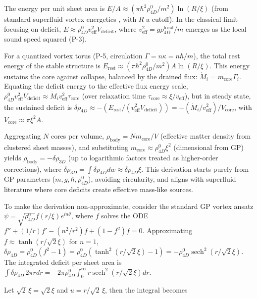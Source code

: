 \documentclass{article}
\DeclareMathOperator{\sech}{sech}
\newcommand{\scale}{\sqrt{2}\,\xi}
\begin{document}
The energy per unit sheet area is $E / A \approx (\pi \hbar^2 \rho_{4D}^0 / m^2) \ln(R / \xi)$ (from standard superfluid vortex energetics \cite{onsager1949, feynman1955}, with $R$ a cutoff). In the classical limit focusing on deficit, $E \approx \rho_{4D}^0 v_{\text{eff}}^2 V_{\text{deficit}}$, where $v_{\text{eff}}^2 = g \rho_{4D}^{\text{local}} / m$ emerges as the local sound speed squared (P-3).

For a quantized vortex torus (P-5, circulation $\Gamma = n \kappa = n \hbar / m$), the total rest energy of the stable structure is $E_{\text{rest}} \approx (\pi \hbar^2 \rho_{4D}^0 / m^2) A \ln(R / \xi)$. This energy sustains the core against collapse, balanced by the drained flux: $\dot{M}_i = m_{\text{core}} \Gamma_i$. Equating the deficit energy to the effective flux energy scale, $\rho_{4D}^0 v_{\text{eff}}^2 V_{\text{deficit}} \approx \dot{M}_i v_{\text{eff}}^2 \tau_{\text{core}}$ (over relaxation time $\tau_{\text{core}} \approx \xi / v_{\text{eff}}$), but in steady state, the sustained deficit is $\delta \rho_{4D} \approx - (E_{\text{rest}} / (v_{\text{eff}}^2 V_{\text{deficit}})) = - (\dot{M}_i / v_{\text{eff}}^2) / V_{\text{core}}$, with $V_{\text{core}} \approx \pi \xi^2 A$.

Aggregating $N$ cores per volume, $\rho_{\text{body}} = N m_{\text{core}} / V$ (effective matter density from clustered sheet masses), and substituting $m_{\text{core}} \approx \rho_{4D}^0 \xi^2$ (dimensional from GP) yields $\rho_{\text{body}} = - \delta \rho_{3D}$ (up to logarithmic factors treated as higher-order corrections), where $\delta \rho_{3D} = \int \delta \rho_{4D} dw \approx \delta \rho_{4D} \xi$. This derivation starts purely from GP parameters ($m, g, \hbar, \rho_{4D}^0$), avoiding circularity, and aligns with superfluid literature where core deficits create effective mass-like sources.

To make the derivation non-approximate, consider the standard GP vortex ansatz $\psi = \sqrt{\rho_{4D}^0} f(r/\xi) e^{i n \theta}$, where $f$ solves the ODE $f'' + (1/r) f' - (n^2/r^2) f + (1 - f^2) f = 0$. Approximating $f \approx \tanh(r/\sqrt{2} \xi)$ for $n=1$, $\delta \rho_{4D} = \rho_{4D}^0 (f^2 - 1) = \rho_{4D}^0 (\tanh^2(r/\sqrt{2} \xi) - 1) = - \rho_{4D}^0 \sech^2(r/\sqrt{2} \xi)$. The integrated deficit per sheet area is $\int \delta \rho_{4D} \, 2\pi r dr = -2\pi \rho_{4D}^0 \int_0^\infty r \sech^2(r/\sqrt{2} \xi) dr$.

Let $\scale = \sqrt{2} \xi$ and $u = r / \scale$, then the integral becomes
\end{document}
